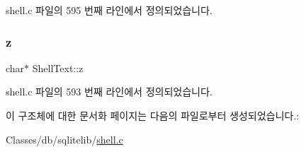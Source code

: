 shell.\+c 파일의 595 번째 라인에서 정의되었습니다.

\mbox{\label{struct_shell_text_ad7acc0c56c1066a865700d2f472b7069}} 
\subsubsection{\texorpdfstring{z}{z}}
{\footnotesize\ttfamily char$\ast$ Shell\+Text\+::z}



shell.\+c 파일의 593 번째 라인에서 정의되었습니다.



이 구조체에 대한 문서화 페이지는 다음의 파일로부터 생성되었습니다.\+:\begin{DoxyCompactItemize}
\item 
Classes/db/sqlitelib/\hyperlink{shell_8c}{shell.\+c}\end{DoxyCompactItemize}
